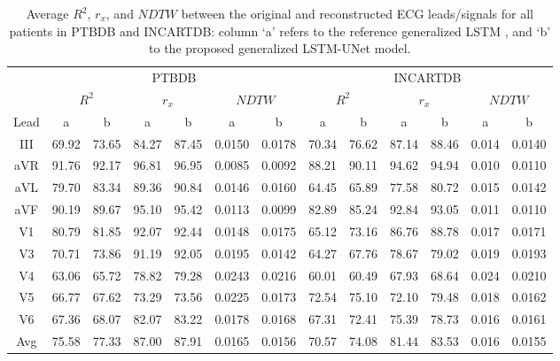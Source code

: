 

\begin{table}
\begin{center}
\begin{small}
\renewcommand{\arraystretch}{1.1}
\renewcommand{\tabcolsep}{9pt}

\caption{Average $R^2$, $r_x$, and $NDTW$ between the original and reconstructed ECG leads/signals for all patients in PTBDB and INCARTDB: column `a' refers to the reference generalized LSTM \cite{lstm}, and `b' to the proposed generalized LSTM-UNet model.}

\begin{tabular}{|c|cc|cc|cc|cc|cc|cc|}
\hline
\cline{2-13}
& \multicolumn{6}{c|}{PTBDB}
& \multicolumn{6}{c|}{INCARTDB} \\

\cline{2-13}
& \multicolumn{2}{c|}{$R^2$}
& \multicolumn{2}{c|}{$r_x$} & \multicolumn{2}{c|}{$NDTW$} & \multicolumn{2}{c|}{$R^2$}
& \multicolumn{2}{c|}{$r_x$} & \multicolumn{2}{c|}{$NDTW$}\\
\cline{2-13}

Lead & a & b & a & b & a & b & a & b & a & b & a & b \\
\hline
III & 69.92 & 73.65 & 84.27 & 87.45 & 0.0150 & 0.0178 & 70.34 & 76.62 & 87.14  & 88.46 & 0.014 & 0.0140\\
aVR & 91.76 & 92.17 & 96.81 & 96.95 & 0.0085 & 0.0092 & 88.21 & 90.11 & 94.62  & 94.94 & 0.010 & 0.0110\\
aVL & 79.70 & 83.34 & 89.36 & 90.84 & 0.0146 & 0.0160 & 64.45 & 65.89 & 77.58  & 80.72 & 0.015 & 0.0142 \\
aVF & 90.19 & 89.67 & 95.10 & 95.42 & 0.0113 & 0.0099 & 82.89 & 85.24 & 92.84  & 93.05 & 0.011 & 0.0110 \\
V1 & 80.79 & 81.85 & 92.07 & 92.44 & 0.0148 & 0.0175 & 65.12  & 73.16 & 86.76  & 88.78 & 0.017 & 0.0171\\
V3 & 70.71 & 73.86 & 91.19 & 92.05 & 0.0195 & 0.0142 & 64.27  & 67.76 & 78.67  & 79.02 & 0.019 & 0.0193 \\
V4 & 63.06 & 65.72 & 78.82 & 79.28 & 0.0243 & 0.0216 & 60.01 & 60.49 &  67.93 & 68.64 & 0.024 & 0.0210\\
V5 & 66.77 & 67.62 & 73.29 & 73.56 & 0.0225 & 0.0173 & 72.54  & 75.10 & 72.10 & 79.48 & 0.018 & 0.0162 \\
V6 & 67.36 & 68.07 & 82.07 & 83.22 & 0.0178 & 0.0168 & 67.31 & 72.41 & 75.39  & 78.73 & 0.016 & 0.0161 \\
\hline
Avg & 75.58 & 77.33 & 87.00 & 87.91 & 0.0165 & 0.0156 & 70.57 & 74.08 & 81.44 & 83.53 & 0.016 & 0.0155 \\


\hline
\end{tabular}
\label{ptbdb_incart_g_overall}
\end{small}

\end{center}
\end{table}